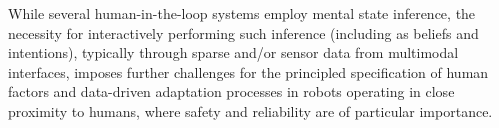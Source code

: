 \documentclass[sigconf,nonacm]{acmart}%
\begin{document}
While several human-in-the-loop systems employ mental state inference, the necessity for interactively performing such inference (including as beliefs and intentions), typically through sparse and/or sensor data from multimodal interfaces, imposes further challenges for the principled specification of human factors and data-driven adaptation processes in robots operating in close proximity to humans, where safety and reliability are of particular importance. 
\end{document}
